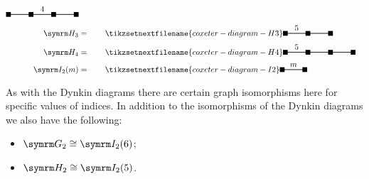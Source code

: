 \begin{align}
\begin{tikzpicture}[coxeter node/.style = {fill, inner sep=3pt}, coxeter wire/.style = {thick}]
        \draw [coxeter wire] (0, 0) -- ++ (3, 0);
        \node [coxeter node] at (0, 0) {};
        \node [coxeter node] at (1, 0) {};
        \node [coxeter node] at (2, 0) {};
        \node [coxeter node] at (3, 0) {};
        \node [above] at (1.5, 0) {\(4\)};
    \end{tikzpicture}
    \\
    \H[3] &= \qquad
    \tikzsetnextfilename{coxeter-diagram-H3}
    \begin{tikzpicture}[coxeter node/.style = {fill, inner sep=3pt}, coxeter wire/.style = {thick}]
        \draw [coxeter wire] (0, 0) -- ++ (2, 0);
        \node [above] at (0.5, 0) {\(5\)};
        \node [coxeter node] at (0, 0) {};
        \node [coxeter node] at (1, 0) {};
        \node [coxeter node] at (2, 0) {};
    \end{tikzpicture}
    \\
    \H[4] &= \qquad
    \tikzsetnextfilename{coxeter-diagram-H4}
    \begin{tikzpicture}[coxeter node/.style = {fill, inner sep=3pt}, coxeter wire/.style = {thick}]
        \draw [coxeter wire] (0, 0) -- ++ (3, 0);
        \node [above] at (0.5, 0) {\(5\)};
        \node [coxeter node] at (0, 0) {};
        \node [coxeter node] at (1, 0) {};
        \node [coxeter node] at (2, 0) {};
        \node [coxeter node] at (3, 0) {};
    \end{tikzpicture}
    \\
    \I[2][m] &= \qquad
    \tikzsetnextfilename{coxeter-diagram-I2}
    \begin{tikzpicture}[coxeter node/.style = {fill, inner sep=3pt}, coxeter wire/.style = {thick}]
        \draw [coxeter wire] (0, 0) -- ++ (1, 0);
        \node [above] at (0.5, 0) {\(m\)};
        \node [coxeter node] at (0, 0) {};
        \node [coxeter node] at (1, 0) {};
    \end{tikzpicture}
\end{align}
\endgroup

As with the Dynkin diagrams there are certain graph isomorphisms here for specific values of indices.
In addition to the isomorphisms of the Dynkin diagrams we also have the following:
\begin{itemize}
    \item \(\G[2] \isomorphic \I[2][6]\);
    \item \(\H[2] \isomorphic \I[2][5]\).
\end{itemize}

